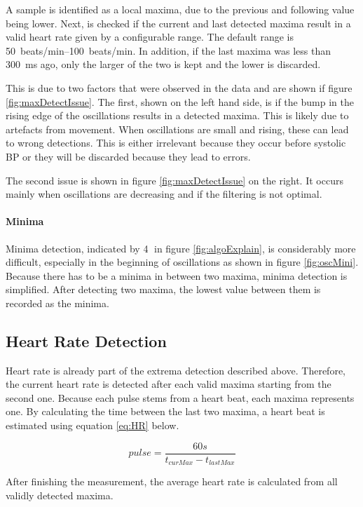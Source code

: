 A sample is identified as a local maxima, due to the previous and following value being lower. Next, is checked if the current and last detected maxima result in a valid heart rate given by a configurable range. The default range is \SIrange{50}{100}{beats/\minute}. In addition, if the last maxima was less than \SI{300}{\milli\second} ago, only the larger of the two is kept and the lower is discarded.

This is due to two factors that were observed in the data and are shown if figure \ref{fig:maxDetectIssue}. The first, shown on the left hand side, is if the bump in the rising edge of the oscillations results in a detected maxima. This is likely due to artefacts from movement. When oscillations are small and rising, these can lead to wrong detections. This is either irrelevant because they occur before systolic BP or they will be discarded because they lead to errors. 

The second issue is shown in figure \ref{fig:maxDetectIssue} on the right. It occurs mainly when oscillations are decreasing and if the filtering is not optimal. 
\paragraph{Minima} Minima detection, indicated by \textcircled{4} in figure \ref{fig:algoExplain}, is considerably more difficult, especially in the beginning of oscillations as shown in figure \ref{fig:oscMini}. Because there has to be a minima in between two maxima, minima detection is simplified. After detecting two maxima, the lowest value between them is recorded as the minima.


\subsection{Heart Rate Detection}\label{sec:HR}
Heart rate is already part of the extrema detection described above. Therefore, the current heart rate is detected after each valid maxima starting from the second one. Because each pulse stems from a heart beat, each maxima represents one. By calculating the time between the last two maxima, a heart beat is estimated using equation \ref{eq:HR} below.

\begin{equation}
\label{eq:HR}
pulse=\frac{60s}{t_{curMax} - t_{lastMax}}
\end{equation}

After finishing the measurement, the average heart rate is calculated from all validly detected maxima.


